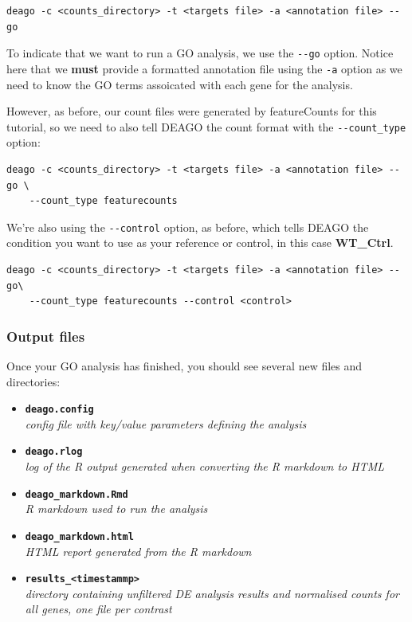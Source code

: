 \documentclass[11pt]{article}
\begin{document}
\begin{verbatim}
deago -c <counts_directory> -t <targets file> -a <annotation file> --go
\end{verbatim}

To indicate that we want to run a GO analysis, we use the
\texttt{-\/-go} option. Notice here that we \textbf{must} provide a
formatted annotation file using the \texttt{-a} option as we need to
know the GO terms assoicated with each gene for the analysis.

However, as before, our count files were generated by featureCounts for
this tutorial, so we need to also tell DEAGO the count format with the
\texttt{-\/-count\_type} option:

\begin{verbatim}
deago -c <counts_directory> -t <targets file> -a <annotation file> --go \
    --count_type featurecounts
\end{verbatim}

We're also using the \texttt{-\/-control} option, as before, which tells
DEAGO the condition you want to use as your reference or control, in
this case \textbf{WT\_Ctrl}.

\begin{verbatim}
deago -c <counts_directory> -t <targets file> -a <annotation file> --go\
    --count_type featurecounts --control <control>
\end{verbatim}

\hypertarget{output-files}{%
\subsubsection{Output files}\label{output-files}}

Once your GO analysis has finished, you should see several new files and
directories:

\begin{itemize}
\item
  \textbf{\texttt{deago.config}}~\\
  \textit{config file with key/value parameters defining the analysis}
\item
  \textbf{\texttt{deago.rlog}}~\\
  \textit{log of the R output generated when converting the R markdown to
  HTML}
\item
  \textbf{\texttt{deago\_markdown.Rmd}}~\\
  \textit{R markdown used to run the analysis}
\item
  \textbf{\texttt{deago\_markdown.html}}~\\
  \textit{HTML report generated from the R markdown}
\item
  \textbf{\texttt{results\_\textless{}timestammp\textgreater{}}}~\\
  \textit{directory containing unfiltered DE analysis results and
  normalised counts for all genes, one file per contrast}
\end{itemize}
\end{document}
